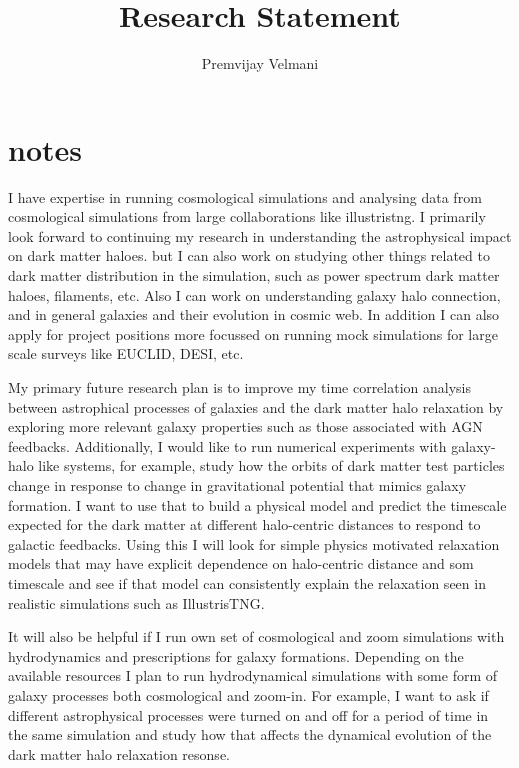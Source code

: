 \documentclass[12pt]{article}
\title{Research Statement}
\author{Premvijay Velmani}
\begin{document}
\maketitle
\section*{notes}
I have expertise in running cosmological simulations and analysing data from cosmological simulations from large collaborations like illustristng. I primarily look forward to continuing my research in understanding the astrophysical impact on dark matter haloes. but I can also work on studying other things related to dark matter distribution in the simulation, such as power spectrum dark matter haloes, filaments, etc. Also I can work on understanding galaxy halo connection, and in general galaxies and their evolution in cosmic web. In addition I can also apply for project positions more focussed on running mock simulations for large scale surveys like EUCLID, DESI, etc. 

My primary future research plan is to improve my time correlation analysis between astrophical processes of galaxies and the dark matter halo relaxation by exploring more relevant galaxy properties such as those associated with AGN feedbacks. Additionally, I would like to run numerical experiments with galaxy- halo like systems, for example, study how the orbits of dark matter test particles change in response to change in gravitational potential that mimics galaxy formation. I want to use that to build a physical model and predict the timescale expected for the dark matter at different halo-centric distances to respond to galactic feedbacks. Using this I will look for simple physics motivated relaxation models that may have explicit dependence on halo-centric distance and som timescale and see if that model can consistently explain the relaxation seen in realistic simulations such as IllustrisTNG. 

It will also be helpful if I run own set of cosmological and zoom simulations with hydrodynamics and prescriptions for galaxy formations.
Depending on the available resources I plan to run hydrodynamical simulations with some form of galaxy processes both cosmological and zoom-in. For example, I want to ask if different astrophysical processes were turned on and off for a period of time in the same simulation and study how that affects the dynamical evolution of the dark matter halo relaxation resonse.


\newpage
\end{document}
